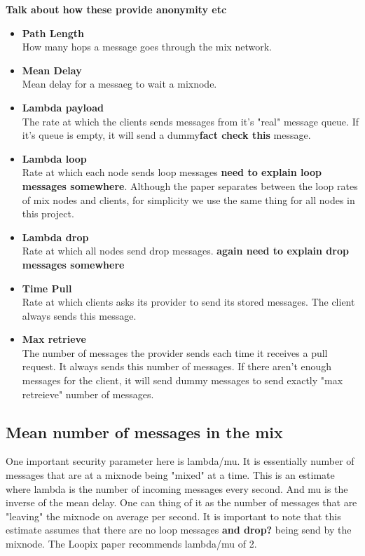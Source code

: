 \documentclass[a4paper,11pt,oneside]{report}
\begin{document}
\textbf{Talk about how these provide anonymity etc}
\begin{itemize}
\item \textbf{Path Length} \\
How many hops a message goes through the mix network.
\item \textbf{Mean Delay} \\
Mean delay for a messaeg to wait a mixnode.
\item \textbf{Lambda payload} \\
The rate at which the clients sends messages from it's "real" message queue. If it's queue is empty, it will send a dummy\textbf{fact check this} message.
\item \textbf{Lambda loop} \\ 
Rate at which each node sends loop messages \textbf{need to explain loop messages somewhere}. Although the paper separates between the loop rates of mix nodes and clients, for simplicity we use the same thing for all nodes in this project.
\item \textbf{Lambda drop} \\
Rate at which all nodes send drop messages. \textbf{again need to explain drop messages somewhere}
\item \textbf{Time Pull} \\
Rate at which clients asks its provider to send its stored messages. The client always sends this message.
\item \textbf{Max retrieve} \\
The number of messages the provider sends each time it receives a pull request. It always sends this number of messages. If there aren't enough messages for the client, it will send dummy messages to send exactly "max retreieve" number of messages.
\end{itemize}

\subsection{Mean number of messages in the mix}
One important security parameter here is lambda/mu. It is essentially number of messages that are at a mixnode being "mixed" at a time. This is an estimate where lambda is the number of incoming messages every second. And mu is the inverse of the mean delay. One can thing of it as the number of messages that are "leaving" the mixnode on average per second. It is important to note that this estimate assumes that there are no loop messages \textbf{and drop?} being send by the mixnode. The Loopix paper recommends lambda/mu of 2. 
\end{document}
